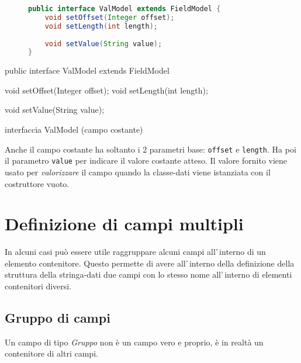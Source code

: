 \ifesource
\begin{figure*}[!htb]
\begin{lstlisting}[language=java, 
caption=interfaccia ValModel (campo costante), 
label=lst:ValModel]
public interface ValModel extends FieldModel {
    void setOffset(Integer offset);
    void setLength(int length);
    
    void setValue(String value);
}
\end{lstlisting}
\end{figure*}
\else
\begin{elisting}[!htb]
\begin{javacode}
public interface ValModel extends FieldModel {
    void setOffset(Integer offset);
    void setLength(int length);
    
    void setValue(String value);
}
\end{javacode}
\caption{interfaccia ValModel (campo costante)}
\label{lst:ValModel}
\end{elisting}
\fi

Anche il campo costante ha soltanto i 2 parametri base: \verb!offset! e 
\verb!length!.
Ha poi il parametro \verb!value! per indicare il valore costante atteso.
Il valore fornito viene usato per \textit{valorizzare} il campo quando la 
classe-dati viene istanziata con il costruttore vuoto.

\chapter{Definizione di campi multipli}
In alcuni casi può essere utile raggruppare alcuni campi all'\,interno di un
elemento contenitore. Questo permette di avere all'\,interno della definizione
della struttura della stringa-dati due campi con lo stesso nome all'\,interno
di elementi contenitori diversi.

\section{Gruppo di campi}
Un campo di tipo \textsl{Gruppo} non è un campo vero e proprio, è in realtà un
contenitore di altri campi.

